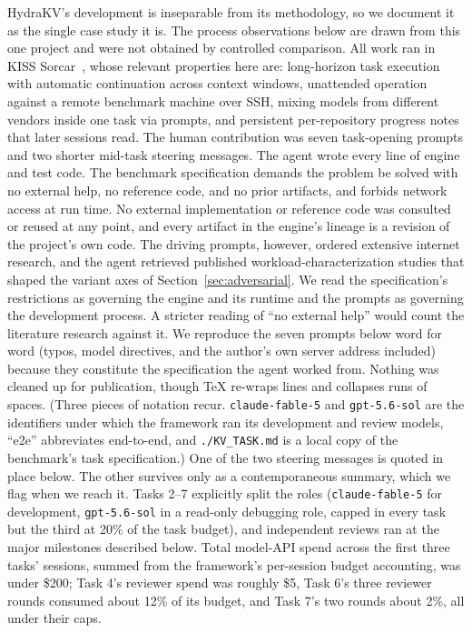 \documentclass{article}
\begin{document}
HydraKV's development is inseparable from its methodology, so we document it as the single case study it is. The process observations below are drawn from this one project and were not obtained by controlled comparison. All work ran in KISS Sorcar~\cite{kisssorcar}, whose relevant properties here are: long-horizon task execution with automatic continuation across context windows, unattended operation against a remote benchmark machine over SSH, mixing models from different vendors inside one task via prompts, and persistent per-repository progress notes that later sessions read. The human contribution was seven task-opening prompts and two shorter mid-task steering messages. The agent wrote every line of engine and test code. The benchmark specification demands the problem be solved with no external help, no reference code, and no prior artifacts, and forbids network access at run time. No external implementation or reference code was consulted or reused at any point, and every artifact in the engine's lineage is a revision of the project's own code. The driving prompts, however, ordered extensive internet research, and the agent retrieved published workload-characterization studies that shaped the variant axes of Section~\ref{sec:adversarial}. We read the specification's restrictions as governing the engine and its runtime and the prompts as governing the development process. A stricter reading of ``no external help'' would count the literature research against it. We reproduce the seven prompts below word for word (typos, model directives, and the author's own server address included) because they constitute the specification the agent worked from. Nothing was cleaned up for publication, though TeX re-wraps lines and collapses runs of spaces. (Three pieces of notation recur. \texttt{claude-fable-5} and \texttt{gpt-5.6-sol} are the identifiers under which the framework ran its development and review models, ``e2e'' abbreviates end-to-end, and \texttt{./KV\_TASK.md} is a local copy of the benchmark's task specification.) One of the two steering messages is quoted in place below. The other survives only as a contemporaneous summary, which we flag when we reach it. Tasks 2--7 explicitly split the roles (\texttt{claude-fable-5} for development, \texttt{gpt-5.6-sol} in a read-only debugging role, capped in every task but the third at 20\% of the task budget), and independent reviews ran at the major milestones described below. Total model-API spend across the first three tasks' sessions, summed from the framework's per-session budget accounting, was under \$200; Task 4's reviewer spend was roughly \$5, Task 6's three reviewer rounds consumed about 12\% of its budget, and Task 7's two rounds about 2\%, all under their caps.
\end{document}
